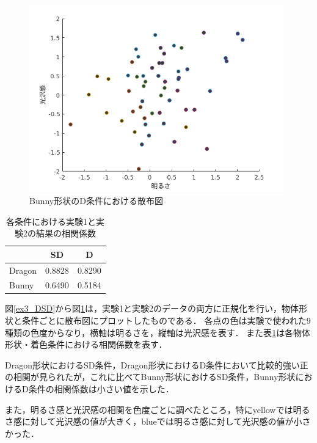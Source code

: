             \begin{figure}[h]
                \centering
                \includegraphics[width=11.0cm]{./img/ex3_BD.png}
                \caption{Bunny形状のD条件における散布図}
                \label{ex3_BD}
            \end{figure}

            \begin{table}[h]
                \centering
                \caption{各条件における実験1と実験2の結果の相関係数}
                \begin{tabular}{|l||c|c|} \hline
                                & SD       & D        \\ \hline \hline
                    Dragon      & 0.8828   & 0.8290   \\ \hline
                    Bunny       & 0.6490   & 0.5184   \\ \hline
                \end{tabular}
                \label{cc}
            \end{table}

            図\ref{ex3_DSD}から図\ref{ex3_BD}は，実験1と実験2のデータの両方に正規化を行い，物体形状と条件ごとに散布図にプロットしたものである．
            各点の色は実験で使われた9種類の色度からなり，横軸は明るさを，縦軸は光沢感を表す．
            また表\ref{cc}は各物体形状・着色条件における相関係数を表す．

            Dragon形状におけるSD条件，Dragon形状におけるD条件において比較的強い正の相関が見られたが，これに比べてBunny形状におけるSD条件，Bunny形状におけるD条件の相関係数は小さい値を示した．
            
            また，明るさ感と光沢感の相関を色度ごとに調べたところ，特にyellowでは明るさ感に対して光沢感の値が大きく，blueでは明るさ感に対して光沢感の値が小さかった．


